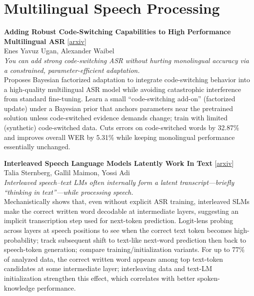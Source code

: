 \documentclass[12pt,letterpaper]{article}
\begin{document}
\medskip


\section*{Multilingual Speech Processing}

{\small\textbf{Adding Robust Code-Switching Capabilities to High Performance Multilingual ASR}} {\scriptsize[\href{https://arxiv.org/abs/2606.21990}{arxiv}]}\\
{\scriptsize Enes Yavuz Ugan, Alexander Waibel}\\

{\small\textit{You can add strong code-switching ASR without hurting monolingual accuracy via a constrained, parameter-efficient adaptation.}}\\[1pt]
{\footnotesize Proposes Bayesian factorized adaptation to integrate code-switching behavior into a high-quality multilingual ASR model while avoiding catastrophic interference from standard fine-tuning. Learn a small ``code-switching add-on'' (factorized update) under a Bayesian prior that anchors parameters near the pretrained solution unless code-switched evidence demands change; train with limited (synthetic) code-switched data. Cuts errors on code-switched words by 32.87\% and improves overall WER by 5.31\% while keeping monolingual performance essentially unchanged.}

\medskip

{\small\textbf{Interleaved Speech Language Models Latently Work In Text}} {\scriptsize[\href{https://arxiv.org/abs/2606.22473}{arxiv}]}\\
{\scriptsize Talia Sternberg, Gallil Maimon, Yossi Adi}\\

{\small\textit{Interleaved speech--text LMs often internally form a latent transcript---briefly ``thinking in text''---while processing speech.}}\\[1pt]
{\footnotesize Mechanistically shows that, even without explicit ASR training, interleaved SLMs make the correct written word decodable at intermediate layers, suggesting an implicit transcription step used for next-token prediction. Logit-lens probing across layers at speech positions to see when the correct text token becomes high-probability; track subsequent shift to text-like next-word prediction then back to speech-token generation; compare training/initialization variants. For up to 77\% of analyzed data, the correct written word appears among top text-token candidates at some intermediate layer; interleaving data and text-LM initialization strengthen this effect, which correlates with better spoken-knowledge performance.}
\end{document}

